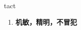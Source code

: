 
\begin{frame}
{\huge tact}
\begin{center}
\begin{enumerate}\Large
  \item \textbf{机敏，精明，不冒犯}
\end{enumerate}
\end{center}
\end{frame}
